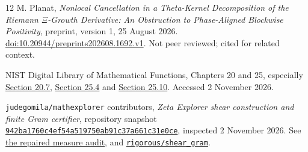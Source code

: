 \documentclass[11pt,letterpaper]{article}
\numberwithin{equation}{section}
\theoremstyle{definition}
\theoremstyle{remark}
\begin{document}
\begin{thebibliography}{12}
M. Planat, \emph{Nonlocal Cancellation in a Theta-Kernel Decomposition of the Riemann $\Xi$-Growth Derivative: An Obstruction to Phase-Aligned Blockwise Positivity}, preprint, version 1, 25 August 2026. \href{https://doi.org/10.20944/preprints202608.1692.v1}{doi:10.20944/preprints202608.1692.v1}. Not peer reviewed; cited for related context.

NIST Digital Library of Mathematical Functions, Chapters 20 and 25, especially \href{https://dlmf.nist.gov/20.7}{Section 20.7}, \href{https://dlmf.nist.gov/25.4}{Section 25.4} and \href{https://dlmf.nist.gov/25.10}{Section 25.10}. Accessed 2 November 2026.

\texttt{judegomila/mathexplorer} contributors, \emph{Zeta Explorer shear construction and finite Gram certifier}, repository snapshot \href{https://github.com/judegomila/mathexplorer/tree/942ba1760c4ef54a519750ab91c37a661c31e0ce}{\texttt{942ba1760c4ef54a519750ab91c37a661c31e0ce}}, inspected 2 November 2026. See \href{https://github.com/judegomila/mathexplorer/blob/942ba1760c4ef54a519750ab91c37a661c31e0ce/formalization/paper/shear_kernel_measure_audit_2026-08-28.md}{the repaired measure audit}, and \href{https://github.com/judegomila/mathexplorer/tree/942ba1760c4ef54a519750ab91c37a661c31e0ce/rigorous/shear_gram}{\texttt{rigorous/shear\_gram}}.
\end{thebibliography}
\end{document}
